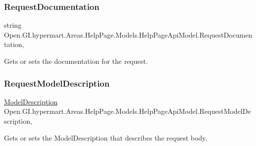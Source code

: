 \subsubsection{\texorpdfstring{Request\+Documentation}{RequestDocumentation}}
{\footnotesize\ttfamily string Open.\+G\+I.\+hypermart.\+Areas.\+Help\+Page.\+Models.\+Help\+Page\+Api\+Model.\+Request\+Documentation\hspace{0.3cm}{\ttfamily [get]}, {\ttfamily [set]}}



Gets or sets the documentation for the request. 

\hypertarget{class_open_1_1_g_i_1_1hypermart_1_1_areas_1_1_help_page_1_1_models_1_1_help_page_api_model_a9922daf50e7226b541b2906b6011947c}{}\label{class_open_1_1_g_i_1_1hypermart_1_1_areas_1_1_help_page_1_1_models_1_1_help_page_api_model_a9922daf50e7226b541b2906b6011947c} 
\subsubsection{\texorpdfstring{Request\+Model\+Description}{RequestModelDescription}}
{\footnotesize\ttfamily \hyperlink{class_open_1_1_g_i_1_1hypermart_1_1_areas_1_1_help_page_1_1_model_descriptions_1_1_model_description}{Model\+Description} Open.\+G\+I.\+hypermart.\+Areas.\+Help\+Page.\+Models.\+Help\+Page\+Api\+Model.\+Request\+Model\+Description\hspace{0.3cm}{\ttfamily [get]}, {\ttfamily [set]}}



Gets or sets the Model\+Description that describes the request body. 

\hypertarget{class_open_1_1_g_i_1_1hypermart_1_1_areas_1_1_help_page_1_1_models_1_1_help_page_api_model_a69f18559e320aecc4dc81f68b8327729}{}\label{class_open_1_1_g_i_1_1hypermart_1_1_areas_1_1_help_page_1_1_models_1_1_help_page_api_model_a69f18559e320aecc4dc81f68b8327729} 
